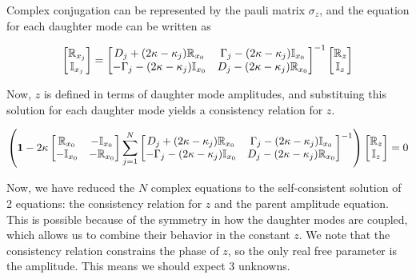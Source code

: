 Complex conjugation can be represented by the pauli matrix $\sigma_z$, and the equation for each daughter mode can be written as 

\begin{equation}
\begin{bmatrix}
\mathbb{R}_{x_j} \\
\mathbb{I}_{x_j} \\
\end{bmatrix}
= 
\begin{bmatrix}
D_j + (2\kappa -\kappa_j)\mathbb{R}_{x_0}        & \Gamma_j - (2\kappa - \kappa_j)\mathbb{I}_{x_0} \\
-\Gamma_j - (2\kappa - \kappa_j)\mathbb{I}_{x_0} & D_j - (2\kappa -\kappa_j)\mathbb{R}_{x_0} \\
\end{bmatrix}^{-1}
\begin{bmatrix}
\mathbb{R}_{z} \\
\mathbb{I}_{z} \\
\end{bmatrix}
\end{equation}

Now, $z$ is defined in terms of daughter mode amplitudes, and substituing this solution for each daughter mode yields a consistency relation for $z$.

\begin{equation}
\left(\mathbf{1} - 2\kappa
\begin{bmatrix}
\mathbb{R}_{x_0} & -\mathbb{I}_{x_0} \\
-\mathbb{I}_{x_0} & -\mathbb{R}_{x_0} \\
\end{bmatrix}
\sum_{j=1}^{N} 
\begin{bmatrix}
D_j + (2\kappa -\kappa_j)\mathbb{R}_{x_0}        & \Gamma_j - (2\kappa - \kappa_j)\mathbb{I}_{x_0} \\
-\Gamma_j - (2\kappa - \kappa_j)\mathbb{I}_{x_0} & D_j - (2\kappa -\kappa_j)\mathbb{R}_{x_0} \\
\end{bmatrix}^{-1}
\right)
\begin{bmatrix}
\mathbb{R}_{z} \\
\mathbb{I}_{z} \\
\end{bmatrix}
= 0
\end{equation}

Now, we have reduced the $N$ complex equations to the self-consistent solution of 2 equations: the consistency relation for $z$ and the parent amplitude equation. This is possible because of the symmetry in how the daughter modes are coupled, which allows us to combine their behavior in the constant $z$. We note that the consistency relation constrains the phase of $z$, so the only real free parameter is the amplitude. This means we should expect 3 unknowns.

